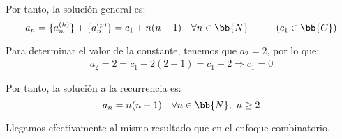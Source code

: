 \documentclass[12pt]{article}
\begin{document}
\begin{ejercicio}
    Por tanto, la solución general es:
    \begin{equation*}
        a_n = \{a_n^{(h)}\} + \{a_n^{(p)}\} = c_1 + n(n-1) \quad \forall n\in \bb{N}\hspace{1cm} (c_1\in \bb{C})
    \end{equation*}

    Para determinar el valor de la constante, tenemos que $a_2=2$, por lo que:
    \begin{align*}
        a_2 = 2  = c_1 + 2(2-1) = c_1 + 2 \Longrightarrow c_1 = 0
    \end{align*}

    Por tanto, la solución a la recurrencia es:
    \begin{equation*}
        a_n = n(n-1) \quad \forall n\in \bb{N},~n\geq 2
    \end{equation*}

    Llegamos efectivamente al mismo resultado que en el enfoque combinatorio.
\end{ejercicio}
\end{document}
